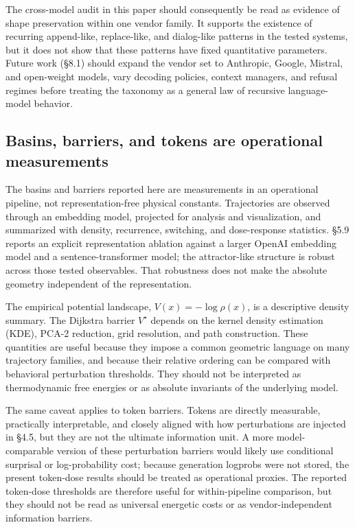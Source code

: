 \documentclass{article}
\theoremstyle{plain}
\theoremstyle{definition}
\begin{document}
The cross-model audit in this paper should consequently be read as evidence of shape preservation within one vendor family. It supports the existence of recurring append-like, replace-like, and dialog-like patterns in the tested systems, but it does not show that these patterns have fixed quantitative parameters. Future work (§8.1) should expand the vendor set to Anthropic, Google, Mistral, and open-weight models, vary decoding policies, context managers, and refusal regimes before treating the taxonomy as a general law of recursive language-model behavior.

\subsection{Basins, barriers, and tokens are operational measurements}

The basins and barriers reported here are measurements in an operational pipeline, not representation-free physical constants. Trajectories are observed through an embedding model, projected for analysis and visualization, and summarized with density, recurrence, switching, and dose-response statistics. §5.9 reports an explicit representation ablation against a larger OpenAI embedding model and a sentence-transformer model; the attractor-like structure is robust across those tested observables. That robustness does not make the absolute geometry independent of the representation.

The empirical potential landscape, \(V(x)=-\log \rho(x)\), is a descriptive density summary. The Dijkstra barrier \(V^\star\) depends on the kernel density estimation (KDE), PCA-2 reduction, grid resolution, and path construction. These quantities are useful because they impose a common geometric language on many trajectory families, and because their relative ordering can be compared with behavioral perturbation thresholds. They should not be interpreted as thermodynamic free energies or as absolute invariants of the underlying model.

The same caveat applies to token barriers. Tokens are directly measurable, practically interpretable, and closely aligned with how perturbations are injected in §4.5, but they are not the ultimate information unit. A more model-comparable version of these perturbation barriers would likely use conditional surprisal or log-probability cost; because generation logprobs were not stored, the present token-dose results should be treated as operational proxies. The reported token-dose thresholds are therefore useful for within-pipeline comparison, but they should not be read as universal energetic costs or as vendor-independent information barriers.
\end{document}
